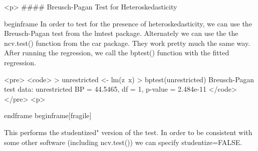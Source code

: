 
<p>
#### {Breusch-Pagan Test for Heteroskedasticity}

begin{frame}
In order to test for the presence of heteroskedasticity, we can use the Breusch-Pagan test from the lmtest
package. Alternately we can use the the ncv.test() function from the car package. They work pretty much
the same way. After running the regression, we call the bptest() function with the fitted regression.


<pre>
<code>
> unrestricted <- lm(z~x)
> bptest(unrestricted)
Breusch-Pagan test
data: unrestricted
BP = 44.5465, df = 1, p-value = 2.484e-11
</code>
</pre>
<p>

end{frame}
begin{frame}[fragile]

This performs the studentized" version of the test. In order to be consistent with some other software
(including ncv.test()) we can specify studentize=FALSE.

